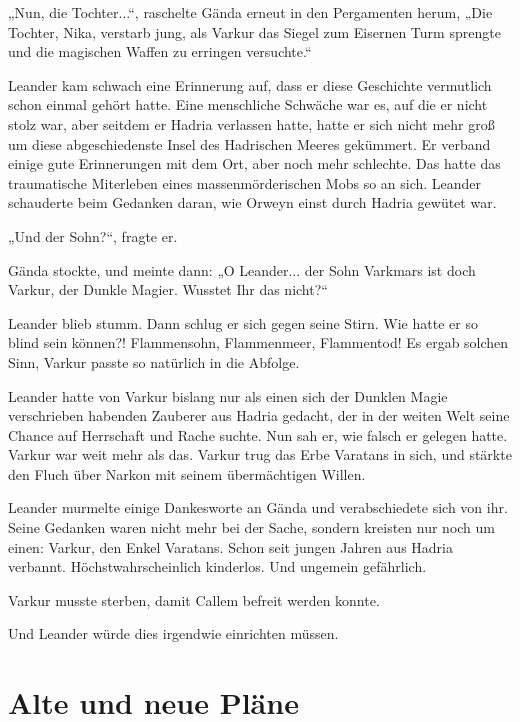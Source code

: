 „Nun, die Tochter...“, raschelte Gända erneut in den Pergamenten herum, „Die Tochter, Nika, verstarb jung, als Varkur das Siegel zum Eisernen Turm sprengte und die magischen Waffen zu erringen versuchte.“

Leander kam schwach eine Erinnerung auf, dass er diese Geschichte vermutlich schon einmal gehört hatte. Eine menschliche Schwäche war es, auf die er nicht stolz war, aber seitdem er Hadria verlassen hatte, hatte er sich nicht mehr groß um diese abgeschiedenste Insel des Hadrischen Meeres gekümmert. Er verband einige gute Erinnerungen mit dem Ort, aber noch mehr schlechte. Das hatte das traumatische Miterleben eines massenmörderischen Mobs so an sich. Leander schauderte beim Gedanken daran, wie Orweyn einst durch Hadria gewütet war.

„Und der Sohn?“, fragte er.

Gända stockte, und meinte dann: „O Leander... der Sohn Varkmars ist doch Varkur, der Dunkle Magier. Wusstet Ihr das nicht?“

Leander blieb stumm. Dann schlug er sich gegen seine Stirn. Wie hatte er so blind sein können?! Flammensohn, Flammenmeer, Flammentod! Es ergab solchen Sinn, Varkur passte so natürlich in die Abfolge.

Leander hatte von Varkur bislang nur als einen sich der Dunklen Magie verschrieben habenden Zauberer aus Hadria gedacht, der in der weiten Welt seine Chance auf Herrschaft und Rache suchte. Nun sah er, wie falsch er gelegen hatte. Varkur war weit mehr als das. Varkur trug das Erbe Varatans in sich, und stärkte den Fluch über Narkon mit seinem übermächtigen Willen.

Leander murmelte einige Dankesworte an Gända und verabschiedete sich von ihr. Seine Gedanken waren nicht mehr bei der Sache, sondern kreisten nur noch um einen: Varkur, den Enkel Varatans. Schon seit jungen Jahren aus Hadria verbannt. Höchstwahrscheinlich kinderlos. Und ungemein gefährlich.

Varkur musste sterben, damit Callem befreit werden konnte.

Und Leander würde dies irgendwie einrichten müssen.








\newpage
\section{Alte und neue Pläne}


